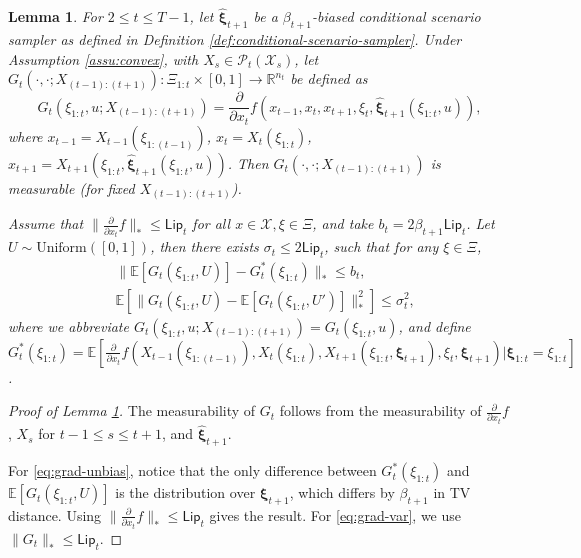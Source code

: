 \documentclass[11pt,fullpage,letterpaper]{article}
\newcommand{\mc}{\mathcal}
\newcommand{\R}{\mathbb{R}}
\newcommand{\E}{\mathbb{E}}
\newcommand{\bx}{\boldsymbol{\xi}}
\newcommand{\lips}{\mathsf{Lip}}
\newtheorem{lemma}{Lemma}[section]
\begin{document}
\begin{lemma}\label{lm:prop-oracle}
For $2\leq t\leq T-1$, let $\widehat{\bx}_{t+1}$ be a $\beta_{t+1}$-biased conditional scenario sampler as defined in Definition \ref{def:conditional-scenario-sampler}. Under Assumption \ref{assu:convex}, with $X_s\in \mc P_t(\mc X_s)$, let $G_t(\cdot,\cdot;X_{(t-1):(t+1)}):\Xi_{1:t}\times [0,1]\to \R^{n_t}$ be defined as 
\begin{equation}\label{eq:choice-of-G}
    G_t(\xi_{1:t},u;X_{(t-1):(t+1)}) = \frac{\partial}{\partial x_t} f(x_{t-1},x_t,x_{t+1},\xi_t,\widehat{\bx}_{t+1}(\xi_{1:t},u)), 
\end{equation}
where $x_{t-1} = X_{t-1}(\xi_{1:(t-1)})$, $x_t = X_t(\xi_{1:t})$, $x_{t+1} = X_{t+1}(\xi_{1:t},\widehat{\bx}_{t+1}(\xi_{1:t},u))$. Then $G_t(\cdot,\cdot;X_{(t-1):(t+1)})$ is measurable (for fixed $X_{(t-1):(t+1)}$). 

Assume that $\|\frac{\partial}{\partial x_t}f\|_*\leq \lips_t$ for all $x\in \mc X,\xi\in \Xi$, and take $b_t = 2\beta_{t+1} \lips_t$. Let $U\sim \text{Uniform}([0,1])$, then there exists $\sigma_t\leq 2\lips_t$, such that for any $\xi\in \Xi$, 
\begin{subequations}\label{eq:grad-conditions}
\begin{align}
    & \|\E[G_t(\xi_{1:t},U)] - G^*_t(\xi_{1:t})\|_*\leq b_t,\label{eq:grad-unbias}\\
    & \E[\|G_t(\xi_{1:t},U) -\E\left[G_t(\xi_{1:t},U')\right] \|^2_*]\leq \sigma^2_t,\label{eq:grad-var} 
\end{align}
\end{subequations}
where we abbreviate $G_t(\xi_{1:t},u;X_{(t-1):(t+1)}) = G_t(\xi_{1:t},u)$, and define $G^*_t(\xi_{1:t}) = \E[\frac{\partial}{\partial x_t} f(X_{t-1}(\xi_{1:(t-1)}),X_t(\xi_{1:t}),X_{t+1}(\xi_{1:t},\bx_{t+1}),\xi_t,\bx_{t+1})|\bx_{1:t} = \xi_{1:t}]$. 
\end{lemma}


\begin{proof}[Proof of Lemma \ref{lm:prop-oracle}]
The measurability of $G_t$ follows from the measurability of $\frac{\partial}{\partial x_t} f$, $X_{s}$ for $t-1\leq s\leq t+1$, and $\widehat{\bx}_{t+1}$.

    For \eqref{eq:grad-unbias}, notice that the only difference between $G_t^{*}(\xi_{1:t})$ and $\E[G_t(\xi_{1:t},U)]$ is the distribution over $\bx_{t+1}$, which differs by $\beta_{t+1}$ in TV distance. Using $\|\frac{\partial}{\partial x_t}f\|_*\leq \lips_t$ gives the result. For \eqref{eq:grad-var}, we use $\|G_t\|_*\leq \lips_t$. 
\end{proof}
\end{document}
